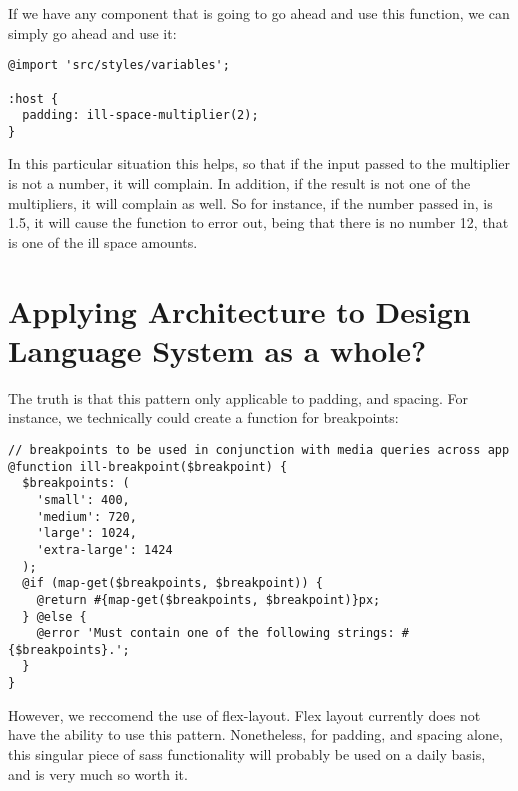 If we have any component that is going to go ahead and use this function, we
can simply go ahead and use it:

\begin{lstlisting}
@import 'src/styles/variables';

:host {
  padding: ill-space-multiplier(2);
}
\end{lstlisting}

In this particular situation this helps, so that if the input passed to the
multiplier is not a number, it will complain. In addition, if the result is not
one of the multipliers, it will complain as well. So for instance, if the number
passed in, is 1.5, it will cause the function to error out, being that there is
no number 12, that is one of the ill space amounts.

\section{ Applying Architecture to Design Language System as a whole? }
The truth is that this pattern only applicable to padding, and spacing. For
instance, we technically could create a function for breakpoints:
\begin{lstlisting}
// breakpoints to be used in conjunction with media queries across app
@function ill-breakpoint($breakpoint) {
  $breakpoints: (
    'small': 400,
    'medium': 720,
    'large': 1024,
    'extra-large': 1424
  );
  @if (map-get($breakpoints, $breakpoint)) {
    @return #{map-get($breakpoints, $breakpoint)}px;
  } @else {
    @error 'Must contain one of the following strings: #{$breakpoints}.';
  }
}
\end{lstlisting}

However, we reccomend the use of flex-layout. Flex layout currently does not
have the ability to use this pattern. Nonetheless, for padding, and spacing
alone, this singular piece of sass functionality will probably be used on a
daily basis, and is very much so worth it. 
